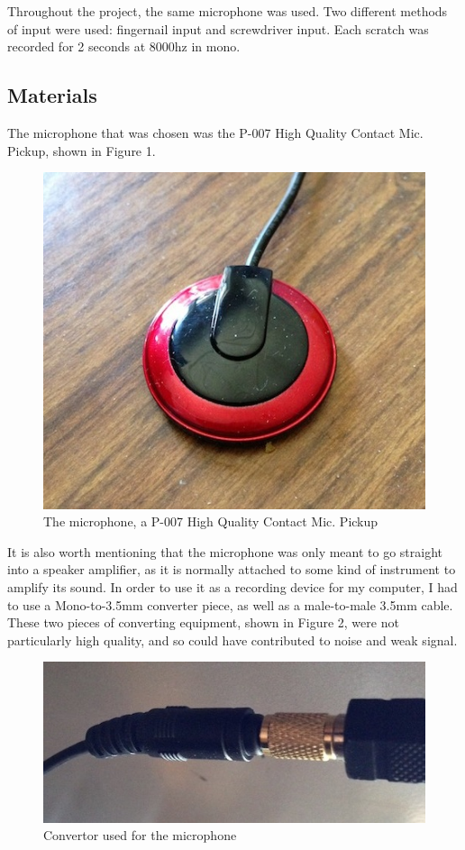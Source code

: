 \documentclass[12pt]{article}
\begin{document}
Throughout the project, the same microphone was used. Two different methods of input were used: fingernail input and screwdriver input. Each scratch was recorded for 2 seconds at 8000hz in mono.

\subsection{Materials}
The microphone that was chosen was the P-007 High Quality Contact Mic. Pickup, shown in Figure 1.

\begin{figure}[h!]
\centering
\includegraphics[scale=0.5]{microphone.jpg}
\caption{The microphone, a P-007 High Quality Contact Mic. Pickup}
\end{figure}

It is also worth mentioning that the microphone was only meant to go straight into a speaker amplifier, as it is normally attached to some kind of instrument to amplify its sound. In order to use it as a recording device for my computer, I had to use a Mono-to-3.5mm converter piece, as well as a male-to-male 3.5mm cable. These two pieces of converting equipment, shown in Figure 2, were not particularly high quality, and so could have contributed to noise and weak signal.

\begin{figure}[h!]
\centering
\includegraphics[scale=0.5]{connection.jpg}
\caption{Convertor used for the microphone}
\end{figure}
\end{document}
